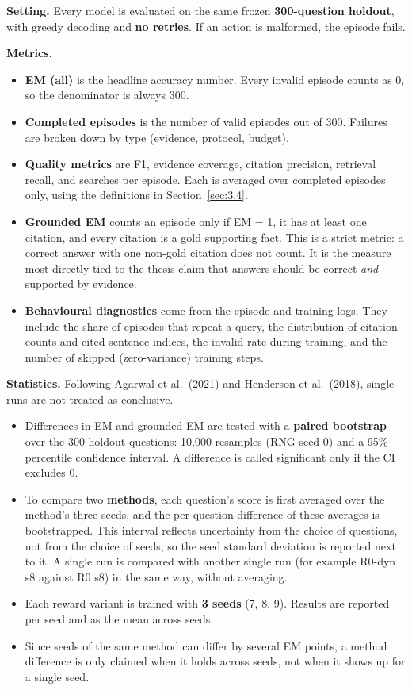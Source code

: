 \textbf{Setting.} Every model is evaluated on the same frozen
\textbf{300-question holdout}, with greedy decoding and \textbf{no
retries}. If an action is malformed, the episode fails.

\textbf{Metrics.}

\begin{itemize}
\tightlist
\item
  \textbf{EM (all)} is the headline accuracy number. Every invalid
  episode counts as 0, so the denominator is always 300.
\item
  \textbf{Completed episodes} is the number of valid episodes out of
  300. Failures are broken down by type (evidence, protocol, budget).
\item
  \textbf{Quality metrics} are F1, evidence coverage, citation
  precision, retrieval recall, and searches per episode. Each is
  averaged over completed episodes only, using the definitions in
  Section~\ref{sec:3.4}.
\item
  \textbf{Grounded EM} counts an episode only if EM = 1, it has at least
  one citation, and every citation is a gold supporting fact. This is a
  strict metric: a correct answer with one non-gold citation does not
  count. It is the measure most directly tied to the thesis claim that
  answers should be correct \emph{and} supported by evidence.
\item
  \textbf{Behavioural diagnostics} come from the episode and training
  logs. They include the share of episodes that repeat a query, the
  distribution of citation counts and cited sentence indices, the
  invalid rate during training, and the number of skipped
  (zero-variance) training steps.
\end{itemize}

\textbf{Statistics.} Following Agarwal et al.~(2021) and Henderson et
al.~(2018), single runs are not treated as conclusive.

\begin{itemize}
\tightlist
\item
  Differences in EM and grounded EM are tested with a \textbf{paired
  bootstrap} over the 300 holdout questions: 10,000 resamples (RNG seed
  0) and a 95\% percentile confidence interval. A difference is called
  significant only if the CI excludes 0.
\item
  To compare two \textbf{methods}, each question's score is first
  averaged over the method's three seeds, and the per-question
  difference of these averages is bootstrapped. This interval reflects
  uncertainty from the choice of questions, not from the choice of
  seeds, so the seed standard deviation is reported next to it. A single
  run is compared with another single run (for example R0-dyn s8 against
  R0 s8) in the same way, without averaging.
\item
  Each reward variant is trained with \textbf{3 seeds} (7, 8, 9).
  Results are reported per seed and as the mean across seeds.
\item
  Since seeds of the same method can differ by several EM points, a
  method difference is only claimed when it holds across seeds, not when
  it shows up for a single seed.
\end{itemize}

